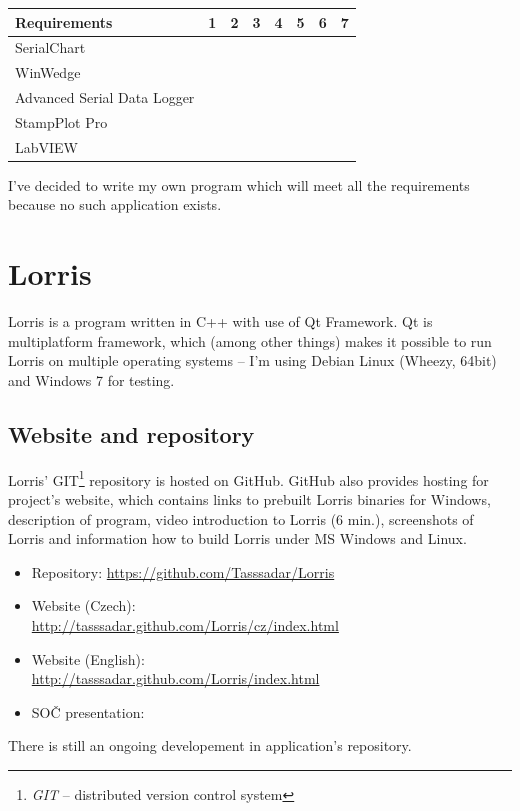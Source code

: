 \documentclass[12pt, a4paper, oneside]{article}
\newcommand{\It}{\textit}  %
\newcommand{\Has}{\textcolor{green}{\CheckmarkBold}}
\newcommand{\NoHas}{\textcolor{red}{\XSolidBrush}}
\begin{document}
\begin{tabular}{ | l | l | l | l | l | l | l | l |}
    \hline
    Requirements                & 1      & 2      & 3      & 4      & 5      & 6      & 7      \\ \hline
    SerialChart                 & \Has   & \NoHas & \Has   & \NoHas & \Has   & \Has   & \Has   \\ \hline 
    WinWedge                    & \NoHas & \Has   & \Has   & \NoHas & \NoHas & \NoHas & \NoHas \\ \hline 
    Advanced Serial Data Logger & \NoHas & \Has   & \Has   & \NoHas & \NoHas & \NoHas & \NoHas \\ \hline 
    StampPlot Pro               & \Has   & \Has   & \NoHas & \NoHas & \Has   & \NoHas & \Has   \\ \hline 
    LabVIEW                     & \Has   & \Has   & \NoHas & \Has   & \NoHas & \NoHas & \Has   \\ \hline
\end{tabular}

\vspace{5mm}

I've decided to write my own program which will meet all the requirements because no such application exists.

\section{Lorris}
Lorris is a program written in C++ with use of Qt Framework\cite{qtfrm}. Qt is multiplatform framework, which (among other things) makes it possible to run Lorris on multiple operating systems -- I'm using Debian Linux\cite{debian} (Wheezy, 64bit) and Windows 7 for testing.

\subsection{Website and repository}
Lorris' GIT\footnote{\It{GIT} -- distributed version control system} repository is hosted on GitHub\cite{github}. GitHub also provides hosting for project's website, which contains links to prebuilt Lorris binaries for Windows, description of program, video introduction to Lorris (6 min.), screenshots of Lorris and information how to build Lorris under MS Windows and Linux.
\begin{itemize}
    \item Repository: \url{https://github.com/Tasssadar/Lorris}
    \item Website (Czech):\\ \url{http://tasssadar.github.com/Lorris/cz/index.html}
    \item Website (English):\\ \url{http://tasssadar.github.com/Lorris/index.html}
    \item SOČ presentation: \\ 
\end{itemize}
There is still an ongoing developement in application's repository.
\end{document}
